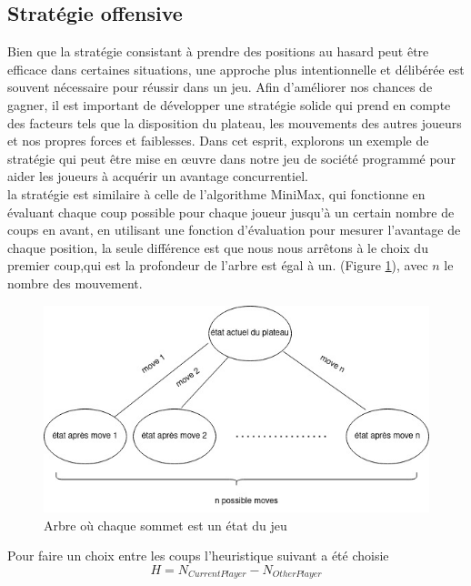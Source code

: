 \documentclass[11pt]{article}
\begin{document}
        \subsection{Stratégie offensive}
        Bien que la stratégie consistant à prendre des positions au hasard peut être efficace dans certaines situations, une approche plus intentionnelle et délibérée est souvent nécessaire pour réussir dans un jeu. Afin d'améliorer nos chances de gagner, il est important de développer une stratégie solide qui prend en compte des facteurs tels que la disposition du plateau, les mouvements des autres joueurs et nos propres forces et faiblesses. Dans cet esprit, explorons un exemple de stratégie qui peut être mise en œuvre dans notre jeu de société programmé pour aider les joueurs à acquérir un avantage concurrentiel.\\
        la stratégie est similaire à celle de l'algorithme MiniMax, qui fonctionne en évaluant chaque coup possible pour chaque joueur jusqu'à un certain nombre de coups en avant, en utilisant une fonction d'évaluation pour mesurer l'avantage de chaque position, la seule différence est que nous nous arrêtons à le choix du premier coup,qui est la profondeur de l'arbre est égal à un. (Figure \ref{fig:tree }), avec $n$ le nombre des mouvement.
                         \begin{figure}[h]
                \centering
                \includegraphics[scale=0.6]{tree.jpg}
                \caption{Arbre où chaque sommet est un état du jeu }
                \label{fig:tree }
            \end{figure}
            
        Pour faire un choix entre les coups l'heuristique suivant a été choisie
        \begin{equation*}
            H = N_{Current Player} - N_{Other Player} 
        \end{equation*}
        
\end{document}

